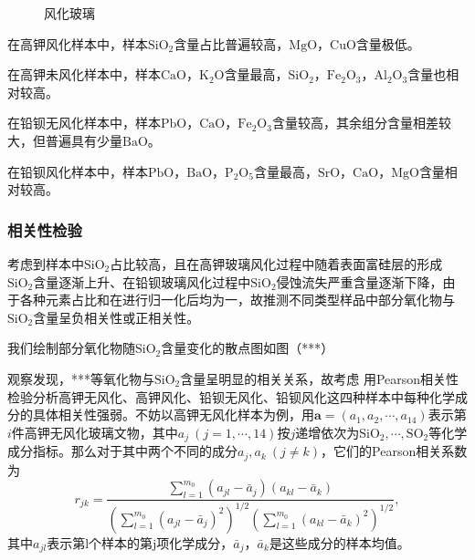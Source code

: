 \documentclass[withoutpreface,bwprint]{cumcmthesis}
\newcommand{\mr}[1]{\mathrm{#1}}
\begin{document}
\begin{figure}[H]
	\caption{风化玻璃}
	\label{fig:未风化雷达图}
\end{figure}

在高钾风化样本中，样本$\mr{SiO_2}$含量占比普遍较高，$\mr{MgO}$，$\mr{CuO}$含量极低。

在高钾未风化样本中，样本$\mr{CaO}$，$\mr{K_2O}$含量最高，$\mr{SiO_2}$，$\mr{Fe_2O_3}$，$\mr{Al_2O_3}$含量也相对较高。

在铅钡无风化样本中，样本$\mr{PbO}$，$\mr{CaO}$，$\mr{Fe_2O_3}$含量较高，其余组分含量相差较大，但普遍具有少量$\mr{BaO}$。

在铅钡风化样本中，样本$\mr{PbO}$，$\mr{BaO}$，$\mr{P_2O_5}$含量最高，$\mr{SrO}$，$\mr{CaO}$，$\mr{MgO}$含量相对较高。

\subsubsection{相关性检验}
\label{se:相关性检验}
考虑到样本中$\mr{SiO_2}$占比较高，且在高钾玻璃风化过程中随着表面富硅层的形成$\mr{SiO_2}$含量逐渐上升、在铅钡玻璃风化过程中$\mr{SiO_2}$侵蚀流失严重含量逐渐下降\cite{刘松2011}，由于各种元素占比和在进行归一化后均为一，故推测不同类型样品中部分氧化物与$\mr{SiO_2}$含量呈负相关性或正相关性。

我们绘制部分氧化物随$\mr{SiO_2}$含量变化的散点图如图（***）

观察发现，***等氧化物与$\mr{SiO_2}$含量呈明显的相关关系，故考虑
用Pearson相关性检验分析高钾无风化、高钾风化、铅钡无风化、铅钡风化这四种样本中每种化学成分的具体相关性强弱。不妨以高钾无风化样本为例，用$\bm{a}=(a_1,a_2,\cdots,a_{14})$表示第$i$件高钾无风化玻璃文物，其中$a_j\ (j=1,\cdots,14)$按$j$递增依次为$\mr{SiO_2},\cdots,\mr{SO_2}$等化学成分指标。那么对于其中两个不同的成分$a_j,a_k\ (j\neq k)$，它们的Pearson相关系数为 
\begin{equation}
	r_{jk}=\frac{\sum_{l=1}^{m_0}(a_{jl}-\bar{a}_j)(a_{kl}-\bar{a}_k)}{\left(\sum_{l=1}^{m_0}(a_{jl}-\bar{a}_j)^2\right)^{1/2}\left(\sum_{l=1}^{m_0}(a_{kl}-\bar{a}_k)^2\right)^{1/2}},
\end{equation}
其中$a_{jl}$表示第l个样本的第j项化学成分，$\bar{a}_j$，$\bar{a}_k$是这些成分的样本均值。
\end{document}
